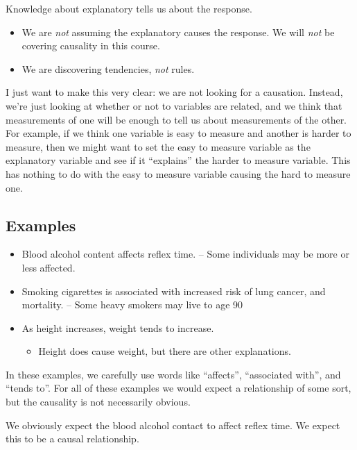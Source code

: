 \documentclass[
  letterpaper,
  DIV=11,
  numbers=noendperiod,
  oneside]{scrreprt}
\providecommand{\tightlist}{%
  \setlength{\itemsep}{0pt}\setlength{\parskip}{0pt}}\usepackage{longtable,booktabs,array}
\begin{document}
Knowledge about explanatory tells us about the response.

\begin{itemize}
\tightlist
\item
  We are \emph{not} assuming the explanatory causes the response. We
  will \emph{not} be covering causality in this course.
\item
  We are discovering tendencies, \emph{not} rules.
\end{itemize}

I just want to make this very clear: we are not looking for a causation.
Instead, we're just looking at whether or not to variables are related,
and we think that measurements of one will be enough to tell us about
measurements of the other. For example, if we think one variable is easy
to measure and another is harder to measure, then we might want to set
the easy to measure variable as the explanatory variable and see if it
``explains'' the harder to measure variable. This has nothing to do with
the easy to measure variable causing the hard to measure one.

\hypertarget{examples}{%
\subsection{Examples}\label{examples}}

\begin{itemize}
\tightlist
\item
  Blood alcohol content affects reflex time. -- Some individuals may be
  more or less affected.
\item
  Smoking cigarettes is associated with increased risk of lung cancer,
  and mortality. -- Some heavy smokers may live to age 90
\item
  As height increases, weight tends to increase.

  \begin{itemize}
  \tightlist
  \item
    Height does cause weight, but there are other explanations.
  \end{itemize}
\end{itemize}

In these examples, we carefully use words like ``affects'', ``associated
with'', and ``tends to''. For all of these examples we would expect a
relationship of some sort, but the causality is not necessarily obvious.

We obviously expect the blood alcohol contact to affect reflex time. We
expect this to be a causal relationship.
\end{document}
